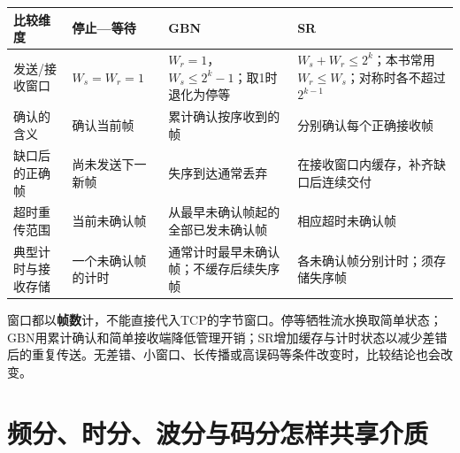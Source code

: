 \begin{wideblock}

\par\medskip\noindent\begin{minipage}{\linewidth}\fontsize{9.3}{12}\selectfont\begin{tabularx}{\linewidth}{@{}YYYY@{}}
\toprule\noalign{}
\begin{minipage}[b]{\linewidth}\raggedright
比较维度
\end{minipage} & \begin{minipage}[b]{\linewidth}\raggedright
停止---等待
\end{minipage} & \begin{minipage}[b]{\linewidth}\raggedright
GBN
\end{minipage} & \begin{minipage}[b]{\linewidth}\raggedright
SR
\end{minipage} \\
\midrule\noalign{}


发送/接收窗口 & \(W_s=W_r=1\) & \(W_r=1\)，\(W_s\le2^k-1\)；取1时退化为停等 & \(W_s+W_r\le2^k\)；本书常用 \(W_r\le W_s\)；对称时各不超过 \(2^{k-1}\) \\
确认的含义 & 确认当前帧 & 累计确认按序收到的帧 & 分别确认每个正确接收帧 \\
缺口后的正确帧 & 尚未发送下一新帧 & 失序到达通常丢弃 & 在接收窗口内缓存，补齐缺口后连续交付 \\
超时重传范围 & 当前未确认帧 & 从最早未确认帧起的全部已发未确认帧 & 相应超时未确认帧 \\
典型计时与接收存储 & 一个未确认帧的计时 & 通常计时最早未确认帧；不缓存后续失序帧 & 各未确认帧分别计时；须存储失序帧 \\
\bottomrule\end{tabularx}
\end{minipage}\par\medskip

\end{wideblock}

窗口都以\textbf{帧数}计，不能直接代入TCP的字节窗口。停等牺牲流水换取简单状态；GBN用累计确认和简单接收端降低管理开销；SR增加缓存与计时状态以减少差错后的重复传送。无差错、小窗口、长传播或高误码等条件改变时，比较结论也会改变。

\section{频分、时分、波分与码分怎样共享介质}\label{CN03-09}

